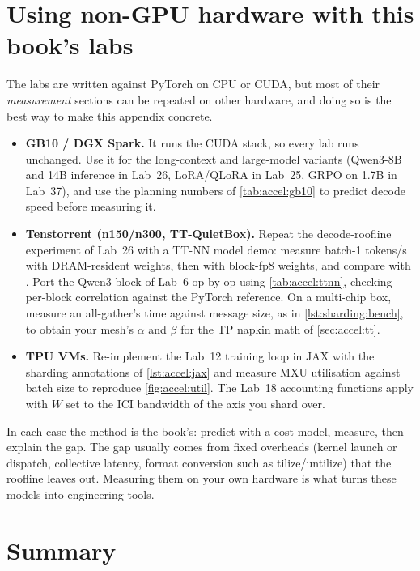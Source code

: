 \section{Using non-GPU hardware with this book's labs}\label{sec:accel:labs}

The labs are written against PyTorch on CPU or CUDA, but most of their \emph{measurement} sections can be
repeated on other hardware, and doing so is the best way to make this appendix concrete.

\begin{itemize}
  \item \textbf{GB10 / DGX Spark.} It runs the CUDA stack, so every lab runs unchanged. Use it for
    the long-context and large-model variants (Qwen3-8B and 14B inference in Lab~26,
    LoRA/QLoRA in Lab~25, GRPO on 1.7B in Lab~37), and use the planning numbers of
    \cref{tab:accel:gb10} to predict decode speed before measuring it.
  \item \textbf{Tenstorrent (n150/n300, TT-QuietBox).} Repeat the decode-roofline experiment of Lab~26
    with a TT-NN model demo: measure batch-1 tokens/s with DRAM-resident weights, then with block-fp8
    weights, and compare with . Port the Qwen3 block of Lab~6
    op by op using \cref{tab:accel:ttnn}, checking per-block correlation against the PyTorch
    reference. On a multi-chip box, measure an all-gather's time against message size, as in
    \cref{lst:sharding:bench}, to obtain your mesh's $\alpha$ and $\beta$ for the TP napkin math of
    \cref{sec:accel:tt}.
  \item \textbf{TPU VMs.} Re-implement the Lab~12 training loop in JAX with the sharding annotations of
    \cref{lst:accel:jax} and measure MXU utilisation against batch size to reproduce
    \cref{fig:accel:util}. The Lab~18 accounting functions apply with $W$ set to the ICI bandwidth of the
    axis you shard over.
\end{itemize}

In each case the method is the book's: predict with a cost model, measure, then explain the gap.
The gap usually comes from fixed overheads (kernel launch or dispatch, collective latency,
format conversion such as tilize/untilize) that the roofline leaves out. Measuring them on your own
hardware is what turns these models into engineering tools.

\section{Summary}\label{sec:accel:summary}


